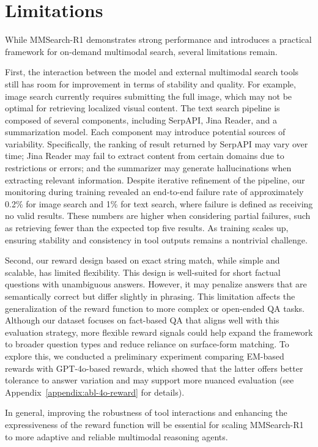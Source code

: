 \documentclass{article}
\begin{document}
\section{Limitations}
\label{appendix:limitations}
While MMSearch-R1 demonstrates strong performance and introduces a practical framework for on-demand multimodal search, several limitations remain.

First, the interaction between the model and external multimodal search tools still has room for improvement in terms of stability and quality. For example, image search currently requires submitting the full image, which may not be optimal for retrieving localized visual content. The text search pipeline is composed of several components, including SerpAPI, Jina Reader, and a summarization model. Each component may introduce potential sources of variability. Specifically, the ranking of result returned by SerpAPI may vary over time; Jina Reader may fail to extract content from certain domains due to restrictions or errors; and the summarizer may generate hallucinations when extracting relevant information. Despite iterative refinement of the pipeline, our monitoring during training revealed an end-to-end failure rate of approximately 0.2\% for image search and 1\% for text search, where failure is defined as receiving no valid results. These numbers are higher when considering partial failures, such as retrieving fewer than the expected top five results. As training scales up, ensuring stability and consistency in tool outputs remains a nontrivial challenge.

Second, our reward design based on exact string match, while simple and scalable, has limited flexibility. This design is well-suited for short factual questions with unambiguous answers. However, it may penalize answers that are semantically correct but differ slightly in phrasing. This limitation affects the generalization of the reward function to more complex or open-ended QA tasks. Although our dataset focuses on fact-based QA that aligns well with this evaluation strategy, more flexible reward signals could help expand the framework to broader question types and reduce reliance on surface-form matching. To explore this, we conducted a preliminary experiment comparing EM-based rewards with GPT-4o-based rewards, which showed that the latter offers better tolerance to answer variation and may support more nuanced evaluation (see Appendix~\ref{appendix:abl-4o-reward} for details). 

In general, improving the robustness of tool interactions and enhancing the expressiveness of the reward function will be essential for scaling MMSearch-R1 to more adaptive and reliable multimodal reasoning agents.
\end{document}
